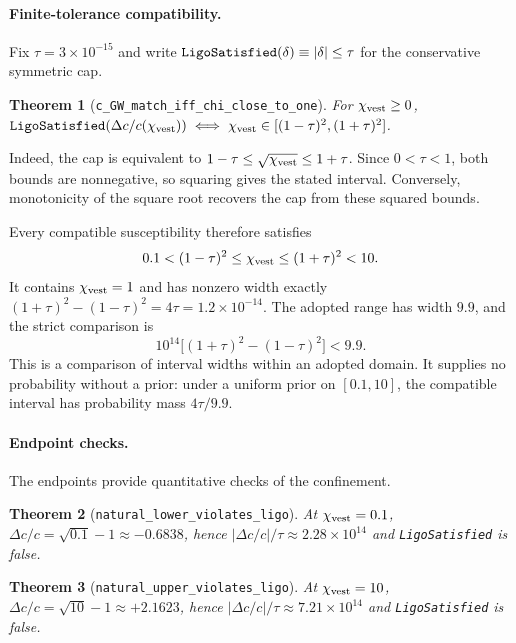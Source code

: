 \documentclass[aps,prl,reprint,nofootinbib,superscriptaddress]{revtex4-2}
\newtheorem{theorem}{Theorem}
\newcommand{\chivest}{\chi_{\rm vest}}
\newcommand{\dccap}{\Delta c/c}
\begin{document}
\paragraph{Finite-tolerance compatibility.}
Fix $\tau=3\times10^{-15}$ and write
$\verb|LigoSatisfied|(\delta)\equiv|\delta|\leq\tau$
for the conservative symmetric cap.

\begin{theorem}[\texttt{c\_GW\_match\_iff\_chi\_close\_to\_one}]
  \label{thm:bicond}
  For $\chivest\geq0$,
  $\verb|LigoSatisfied|(\dccap(\chivest))
  \;\Longleftrightarrow\;
  \chivest\in[(1-\tau)^2,(1+\tau)^2]$.
\end{theorem}

Indeed, the cap is equivalent to
$1-\tau\leq\sqrt{\chivest}\leq1+\tau$.
Since $0<\tau<1$, both bounds are nonnegative, so squaring
gives the stated interval. Conversely, monotonicity of the
square root recovers the cap from these squared bounds.

Every compatible susceptibility therefore satisfies
\[
  0.1<(1-\tau)^2\leq\chivest\leq(1+\tau)^2<10.
\]
It contains $\chivest=1$ and has nonzero width exactly
$(1+\tau)^2-(1-\tau)^2=4\tau=1.2\times10^{-14}$.
The adopted range has width $9.9$, and the strict comparison is
\[
  10^{14}\bigl[(1+\tau)^2-(1-\tau)^2\bigr]<9.9.
\]
This is a comparison of interval widths within an adopted domain.
It supplies no probability without a prior: under a uniform prior
on $[0.1,10]$, the compatible interval has probability mass
$4\tau/9.9$.

\paragraph{Endpoint checks.}
The endpoints provide quantitative checks of the confinement.

\begin{theorem}[\texttt{natural\_lower\_violates\_ligo}]
  \label{thm:falsifier-lower}
  At $\chivest=0.1$, $\dccap=\sqrt{0.1}-1\approx-0.6838$,
  hence $|\dccap|/\tau\approx2.28\times10^{14}$ and
  \verb|LigoSatisfied| is false.
\end{theorem}

\begin{theorem}[\texttt{natural\_upper\_violates\_ligo}]
  \label{thm:falsifier-upper}
  At $\chivest=10$, $\dccap=\sqrt{10}-1\approx+2.1623$,
  hence $|\dccap|/\tau\approx7.21\times10^{14}$ and
  \verb|LigoSatisfied| is false.
\end{theorem}
\end{document}
